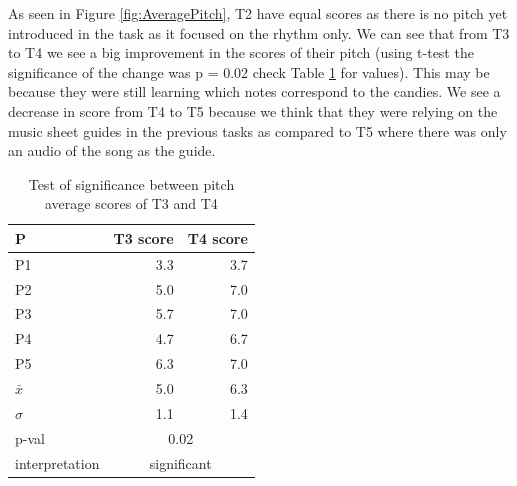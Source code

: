 As seen in Figure \ref{fig:AveragePitch}, T2 have equal scores as there is no pitch yet introduced in the task as it focused on the rhythm only. We can see that from T3 to T4 we see a big improvement in the scores of their pitch (using t-test the significance of the change was p = 0.02 check Table \ref{table:T3vT4pitch} for values). This may be because they were still learning which notes correspond to the candies. We see a decrease in score from T4 to T5 because we think that they were relying on the music sheet guides in the previous tasks as compared to T5 where there was only an audio of the song as the guide. 

\begin{table}[H]
\caption{Test of significance between pitch average scores of T3 and T4}
\label{table:T3vT4pitch}
\centering
\begin{tabular}{lrr}
\hline \hline
P    & T3 score          & T4 score          \\ \hline 
P1             & 3.3                                    & 3.7                                    \\ \hline
P2             & 5.0                                    & 7.0                                    \\ \hline
P3             & 5.7                                    & 7.0                                    \\ \hline
P4             & 4.7                                    & 6.7                                    \\ \hline
P5             & 6.3                                    & 7.0                                    \\ \hline
$\bar{x}$             & 5.0 & 6.3                                                        \\ \hline
$\sigma$              & 1.1                            & 1.4                           \\ \hline
p-val          & \multicolumn{2}{c}{0.02}                                                       \\ \hline
interpretation & \multicolumn{2}{c}{significant} \\ \hline \hline 
\end{tabular}
\end{table}

